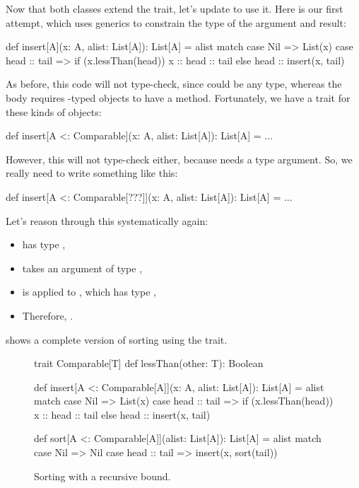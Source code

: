 \documentclass[9pt]{extbook}
\begin{document}
Now that both classes extend the  trait, let's
update  to use it. Here is our first attempt, which
uses generics to constrain the type of the argument and result:
%
\begin{scalacode}
def insert[A](x: A, alist: List[A]): List[A] = alist match {
  case Nil => List(x)
  case head :: tail => if (x.lessThan(head)) { x :: head :: tail } else { head :: insert(x, tail) }
}
\end{scalacode}
As before, this code will not type-check, since  could be any
type, whereas the body requires -typed objects to have a 
method. Fortunately, we have a trait for these kinds of objects:
\begin{scalacode}
def insert[A <: Comparable](x: A, alist: List[A]): List[A] = ...
\end{scalacode}
However, this will not type-check either, because  needs
a type argument. So, we really need to write something like this:
\begin{scalacode}
def insert[A <: Comparable[???]](x: A, alist: List[A]): List[A] = ...
\end{scalacode}

Let's reason through this systematically again:
%
\begin{itemize}

  \item {} has type ,

  \item {} takes an argument of type ,

  \item {} is applied to , which has
  type ,

  \item Therefore, .

\end{itemize}

 shows a complete version of sorting using
the  trait.

\begin{figure}
\begin{scalacode}
trait Comparable[T] {
  def lessThan(other: T): Boolean
}

def insert[A <: Comparable[A]](x: A, alist: List[A]): List[A] = alist match {
  case Nil => List(x)
  case head :: tail => if (x.lessThan(head)) { x :: head :: tail } else { head :: insert(x, tail) }
}

def sort[A <: Comparable[A]](alist: List[A]): List[A] = alist match {
  case Nil => Nil
  case head :: tail => insert(x, sort(tail))
}
\end{scalacode}
\caption{Sorting with a recursive bound.}
\label{sort_sortable_complete}
\end{figure}
\end{document}
